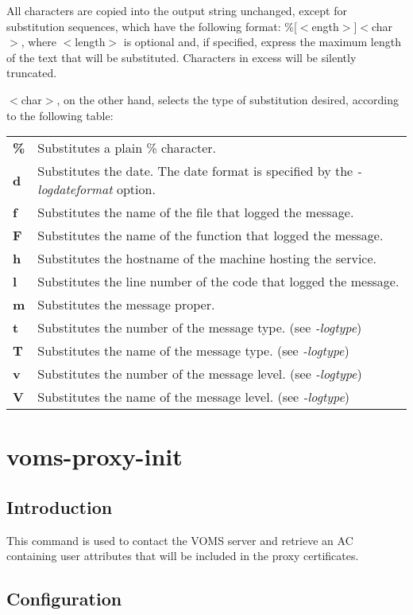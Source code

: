 \documentclass[a4paper]{book}
\begin{document}
All characters are copied into the output string unchanged, except for
substitution sequences, which have the following format:
\%[$<$ength$>$]$<$char$>$, where $<$length$>$ is optional and, if
specified, express the maximum length of the text that will be
substituted. Characters in excess will be silently truncated.

$<$char$>$, on the other hand, selects the type of substitution desired,
according to the following table:

\begin{longtable}{lp{4in}}
\textbf{\%} & Substitutes a plain \% character.\\
\textbf{d}  & Substitutes the date. The date format is specified by
              the \emph{-logdateformat} option.\\
\textbf{f}  & Substitutes the name of the file that logged the message.\\
\textbf{F}  & Substitutes the name of the function that logged the message.\\
\textbf{h}  & Substitutes the hostname of the machine hosting the service.\\
\textbf{l}  & Substitutes the line number of the code that logged the message.\\
\textbf{m}  & Substitutes the message proper.\\
\textbf{t}  & Substitutes the number of the message type. (see \emph{-logtype})\\
\textbf{T}  & Substitutes the name of the message type. (see \emph{-logtype})\\
\textbf{v}  & Substitutes the number of the message level. (see \emph{-logtype})\\
\textbf{V}  & Substitutes the name of the message level. (see \emph{-logtype})\\
\end{longtable}

\chapter{voms-proxy-init}
\section{Introduction}
This command is used to contact the VOMS server and retrieve an AC
containing user attributes that will be included in the proxy
certificates.


\section{Configuration}
\end{document}
